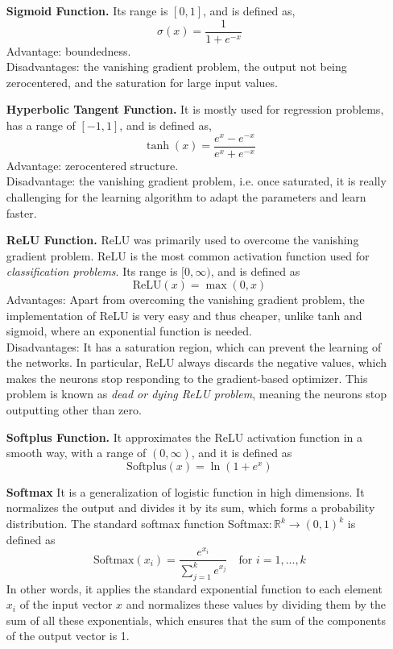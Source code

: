 \documentclass{tufte-handout}
\begin{document}
\begin{enumerate}
  \item[\bf Sigmoid Function.] Its range is $[0,1]$, and is defined as,
$$\sigma(x) = \frac{1}{1 + e^{-x}}$$
Advantage: boundedness. \\ Disadvantages:
the vanishing gradient problem, the output not being zerocentered, and the saturation for large input values. 
  \item[\bf Hyperbolic Tangent Function.] It is mostly used for
regression problems, has a range of $[-1,1]$, and is defined as,
$$\tanh(x) = \frac{e^{x} - e^{-x}}{e^{x} + e^{-x}}$$
Advantage: zerocentered structure. \\
Disadvantage: the vanishing gradient problem, i.e. once saturated, it is really challenging
for the learning algorithm to adapt the parameters and learn
faster.
  \item[\bf ReLU Function.] ReLU was primarily used to overcome the vanishing gradient problem. ReLU is the most common activation function used for \textit{classification problems}. Its range is $[0, \infty)$, and is defined as
  $$\text{ReLU}(x) = \max(0, x)$$
Advantages: Apart from overcoming the vanishing gradient problem, the
implementation of ReLU is very easy and thus cheaper, unlike
tanh and sigmoid, where an exponential function is needed.
\\
Disadvantages: It has a saturation region, which can prevent the
learning of the networks. In particular, ReLU always discards
the negative values, which makes the neurons stop responding to
the gradient-based optimizer. This problem is known as \textit{dead
or dying ReLU problem}, meaning the neurons stop
outputting other than zero. 
\item[\bf Softplus Function.] It approximates the ReLU activation function in a smooth way, with a range of $(0, \infty)$, and it is defined as
$$\text{Softplus}(x) = \ln (1+ e^x) $$
\item[\bf Softmax] It is a generalization of logistic
function in high dimensions. It normalizes the output and
divides it by its sum, which forms a probability distribution. The standard softmax function Softmax$: \mathbb{R}^k \to (0,1)^k$ is defined as 
$$\text{Softmax}(x_i) = \frac{e^{x_i}}{\sum^{k}_{j=1} e^{x_j}} \quad \text{for } i= 1,...,k   $$
In other words, it applies
the standard exponential function to each element $x_i$
of the input vector $x$ and normalizes these values by
dividing them by the sum of all these exponentials, which ensures that the sum of the components of the output vector is 1.

\end{enumerate}
\end{document}
